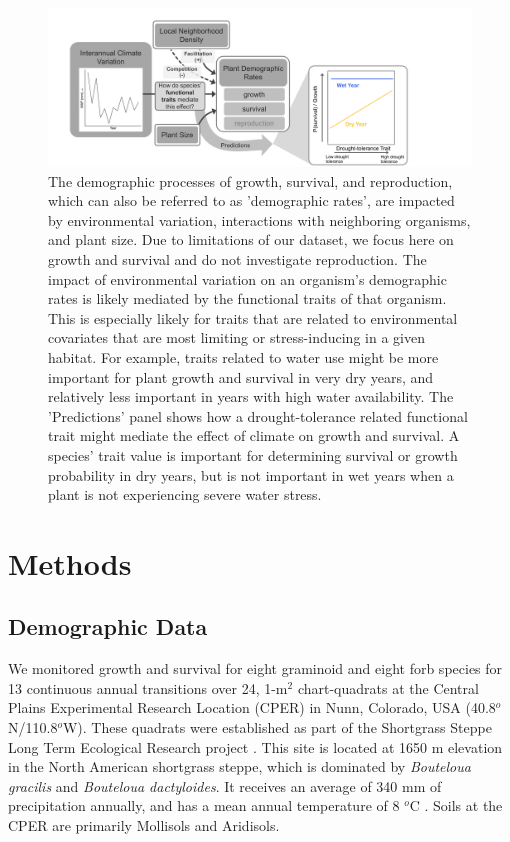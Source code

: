 \documentclass[12pt, letterpaper]{article}
\begin{document}
\begin{figure}
\includegraphics[width=1\textwidth]{figures/CO_sgs_ConceptualFigure.pdf}
\caption{\small{
The demographic processes of growth, survival, and reproduction, which can also be referred to as 'demographic rates', are impacted by environmental variation, interactions with neighboring organisms, and plant size. Due to limitations of our dataset, we focus here on growth and survival and do not investigate reproduction. The impact of environmental variation on an organism's demographic rates is likely mediated by the functional traits of that organism. This is especially likely for traits that are related to environmental covariates that are most limiting or stress-inducing in a given habitat. For example, traits related to water use might be more important for plant growth and survival in very dry years, and relatively less important in years with high water availability. The 'Predictions' panel shows how a drought-tolerance related functional trait might mediate the effect of climate on growth and survival. A species' trait value is important for determining survival or growth probability in dry years, but is not important in wet years when a plant is not experiencing severe water stress. 
}}
\label{fig:ConceptFig}
\end{figure}

\section{Methods}
\subsection{Demographic Data} 
We monitored growth and survival for eight graminoid and eight forb species for 13 continuous annual transitions over 24, 1-m$^2$ chart-quadrats at the Central Plains Experimental Research Location (CPER) in Nunn, Colorado, USA (40.8$^o$N/110.8$^o$W). These quadrats were established as part of the Shortgrass Steppe Long Term Ecological Research project \citep{Chu2013}. This site is located at 1650 m elevation in the North American shortgrass steppe, which is dominated by \textit{Bouteloua gracilis} and \textit{Bouteloua dactyloides}. It receives an average of 340 mm of precipitation annually, and has a mean annual temperature of 8 $^o$C \citep{Chu2014}. Soils at the CPER are primarily Mollisols and Aridisols.
\end{document}
